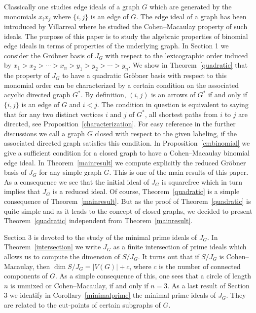 \documentclass[11pt]{amsart}
\begin{document}
Classically one studies edge ideals of a graph $G$ which are generated by the monomials $x_ix_j$ where $\{i,j\}$ is an
edge of $G$. The edge ideal of a graph has been introduced by Villarreal \cite{V} where he studied the Cohen--Macaulay
property of such ideals. The purpose of this paper is to study the algebraic properties of binomial edge ideals in terms
of properties of the underlying graph. In Section 1 we consider the Gr\"obner basis of $J_G$ with respect to the
lexicographic order induced by $x_1>x_2>\cdots >x_n>y_1>y_2>\cdots >y_n$. We show in Theorem~\ref{quadratic} that the property of $J_G$
to have a quadratic Gr\"obner basis with respect to this monomial order can be characterized by a certain condition on the associated acyclic directed graph $G^*$. By definition, $(i,j)$  is an  arrows of $G^*$ if and only if $\{i,j\}$ is an edge of $G$ and $i<j$. The condition in question is equivalent to saying that for any two distinct vertices $i$ and $j$ of $G^*$, all shortest paths from $i$ to $j$ are directed, see Proposition~\ref{characterization}. For easy reference in the further discussions we call a graph $G$  closed with respect to the given labeling, if the associated directed graph satisfies this condition. In Proposition~\ref{cmbinomial} we give a sufficient
condition for a closed graph to have a Cohen--Macaulay binomial edge ideal. In Theorem~\ref{mainresult} we compute
explicitly the reduced Gr\"obner basis of $J_G$ for any simple graph $G$.  This is one of the main results of this paper. As a
consequence we see that the initial ideal of $J_G$ is squarefree which in turn implies that $J_G$ is a reduced
ideal. Of course, Theorem~\ref{quadratic} is a simple consequence of  Theorem~\ref{mainresult}. But as the proof of Theorem~\ref{quadratic} is quite simple and as it leads to the concept of closed graphs, we decided to present Theorem~\ref{quadratic}  independent from Theorem~\ref{mainresult}.



Section 3 is devoted to the study of the minimal prime ideals of $J_G$. In Theorem~\ref{intersection} we write $J_G$ as a finite intersection of prime ideals which allows us to
compute the dimension of $S/J_G$. It turns out that if $S/J_G$ is Cohen--Macaulay, then $\dim S/J_G=|V(G)|+c$, where $c$
is the number of connected components of $G$. As a simple consequence of this, one sees that a circle of length $n$ is
unmixed or Cohen--Macaulay, if and only if $n=3$. As a last result of Section 3 we identify in Corollary~\ref{minimalprime} the minimal prime ideals of $J_G$.  They are related to the cut-points of certain subgraphs of $G$.
\end{document}
